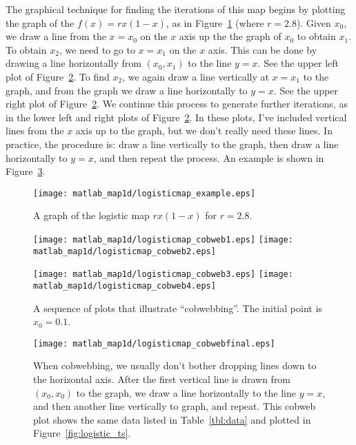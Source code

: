 The graphical technique for finding the iterations of this map
begins by plotting the graph of the $f(x) = rx(1-x)$, as in
Figure~\ref{fig:logisticmap_example} (where $r=2.8$).
Given $x_0$, we draw a line from the $x=x_0$ on the $x$
axis up the the graph of $x_0$ to obtain $x_1$.
To obtain $x_2$, we need to go to $x=x_1$ on the $x$ axis.
This can be done by drawing a line horizontally from
$(x_0,x_1)$ to the line $y=x$.
See the upper left plot of Figure~\ref{fig:cobwebsequence}.
To find $x_2$, we again draw a line vertically
at $x=x_1$ to the graph, and from the graph we draw a 
line horizontally to $y=x$.
See the upper right plot of Figure~\ref{fig:cobwebsequence}.
We continue this process to generate further iterations,
as in the lower left and right plots of
Figure~\ref{fig:cobwebsequence}.
In these plots, I've included vertical lines from the $x$ axis
up to the graph, but we don't really need these lines.
In practice, the procedure is: 
draw a line vertically
to the graph, then 
draw a line horizontally to $y=x$,  and then repeat
the process.
An example is shown in Figure~\ref{fig:cobwebfinal}.

\begin{figure}
\centerline{\texttt{[image: matlab\_map1d/logisticmap\_example.eps]}}
\caption{A graph of the logistic map $rx(1-x)$ for $r=2.8$.}
\label{fig:logisticmap_example}
\end{figure}
%
\begin{figure}
\centerline{%
\texttt{[image: matlab\_map1d/logisticmap\_cobweb1.eps]}
\texttt{[image: matlab\_map1d/logisticmap\_cobweb2.eps]}
}
\centerline{%
\texttt{[image: matlab\_map1d/logisticmap\_cobweb3.eps]}
\texttt{[image: matlab\_map1d/logisticmap\_cobweb4.eps]}
}
\caption{A sequence of plots that illustrate
``cobwebbing''. The initial point is $x_0=0.1$.}
\label{fig:cobwebsequence}
\end{figure}
%
\begin{figure}
\centerline{%
\texttt{[image: matlab\_map1d/logisticmap\_cobwebfinal.eps]}
}
\caption{When cobwebbing, we usually don't bother dropping
lines down to the horizontal axis. After the first vertical
line is drawn from $(x_0,x_0)$ to the graph, we draw
a line horizontally to the line
$y=x$, and then another line vertically to graph, and repeat.
This cobweb plot shows
the same data listed in Table~\ref{tbl:data} and plotted in
Figure~\ref{fig:logistic_ts}.}
\label{fig:cobwebfinal} 
\end{figure}
%


